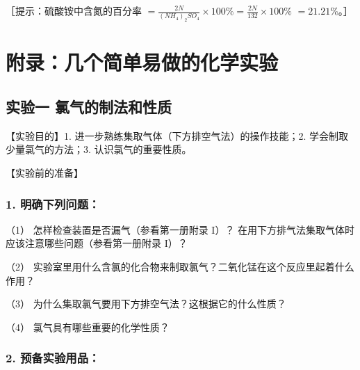 ［提示：硫酸铵中含氮的百分率
\(= \frac{2N}{(NH_4)_2SO_4}\times 100\% = \frac{2N}{132}\times 100\%\)
\(= 21.21\%\)。］

\chapter{附录：几个简单易做的化学实验}

\section{实验一 氯气的制法和性质}

【实验目的】1. 进一步熟练集取气体（下方排空气法）的操作技能；2.
学会制取少量氯气的方法；3. 认识氯气的重要性质。

【实验前的准备】

\subsection{1. 明确下列问题：}

（1） 怎样检查装置是否漏气（参看第一册附录 I）？
在用下方排气法集取气体时应该注意哪些问题（参看第一册附录 I）？

（2）
实验室里用什么含氯的化合物来制取氯气？二氧化锰在这个反应里起着什么作用？

（3） 为什么集取氯气要用下方排空气法？这根据它的什么性质？

（4） 氯气具有哪些重要的化学性质？

\subsection{2. 预备实验用品：}

